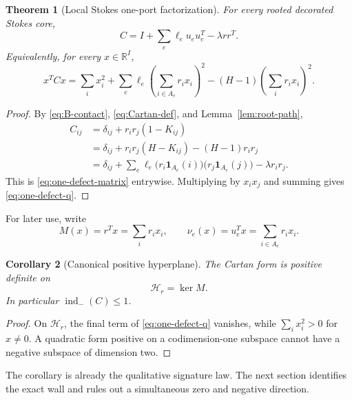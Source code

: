 \documentclass[11pt,a4paper]{amsart}
\theoremstyle{plain}
\newtheorem{theorem}{Theorem}[section]
\newtheorem{corollary}[theorem]{Corollary}
\theoremstyle{definition}
\newcommand{\RR}{\mathbb R}
\newcommand{\one}{\mathbf 1}
\newcommand{\indm}{\operatorname{ind}_{-}}
\newcommand{\Hcal}{\mathcal H}
\begin{document}
\begin{theorem}[Local Stokes one-port factorization]\label{thm:one-defect}
For every rooted decorated Stokes core,
\begin{equation}\label{eq:one-defect-matrix}
 \boxed{\quad C=I+\sum_e\ell_eu_eu_e^T-\lambda rr^T.\quad}
\end{equation}
Equivalently, for every $x\in\RR^I$,
\begin{equation}\label{eq:one-defect-q}
 \boxed{\quad
 x^TCx=\sum_i x_i^2+
 \sum_e\ell_e\left(\sum_{i\in A_e}r_ix_i\right)^2
 -(H-1)\left(\sum_i r_ix_i\right)^2.\quad}
\end{equation}
\end{theorem}

\begin{proof}
By \eqref{eq:B-contact}, \eqref{eq:Cartan-def}, and Lemma~\ref{lem:root-path},
\begin{align*}
 C_{ij}
 &=\delta_{ij}+r_ir_j(1-K_{ij})\\
 &=\delta_{ij}+r_ir_j(H-K_{ij})-(H-1)r_ir_j\\
 &=\delta_{ij}+\sum_e\ell_e
   \bigl(r_i\one_{A_e}(i)\bigr)\bigl(r_j\one_{A_e}(j)\bigr)
   -\lambda r_ir_j.
\end{align*}
This is \eqref{eq:one-defect-matrix} entrywise.  Multiplying by $x_ix_j$ and summing gives
\eqref{eq:one-defect-q}.
\end{proof}

For later use, write
\begin{equation}\label{eq:mass-conormals}
 M(x)=r^Tx=\sum_i r_ix_i,
 \qquad \nu_e(x)=u_e^Tx=\sum_{i\in A_e}r_ix_i.
\end{equation}

\begin{corollary}[Canonical positive hyperplane]\label{cor:hyperplane}
The Cartan form is positive definite on
\[
                         \Hcal_r=\ker M.
\]
In particular $\indm(C)\le1$.
\end{corollary}

\begin{proof}
On $\Hcal_r$, the final term of \eqref{eq:one-defect-q} vanishes, while
$\sum_i x_i^2>0$ for $x\ne0$.  A quadratic form positive on a codimension-one subspace cannot have
a negative subspace of dimension two.
\end{proof}

The corollary is already the qualitative signature law.  The next section identifies the exact
wall and rules out a simultaneous zero and negative direction.
\end{document}
